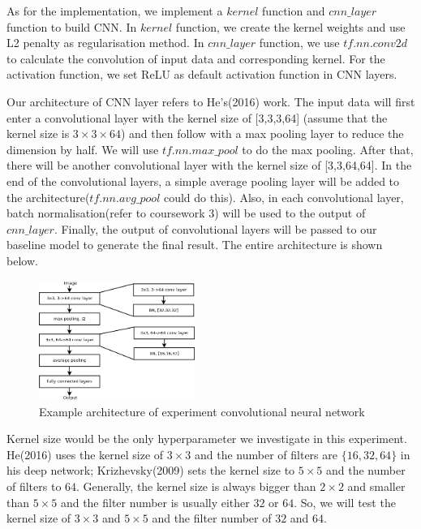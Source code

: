 \documentclass[]{article}
\begin{document}
As for the implementation, we implement a $kernel$ function and $cnn\_layer$ function to build CNN. In $kernel$ function, we create the kernel weights and use L2 penalty as regularisation method. In $cnn\_layer$ function, we use $tf.nn.conv2d$ to calculate the convolution of input data and corresponding kernel. For the activation function, we set ReLU as default activation function in CNN layers.

Our architecture of CNN layer refers to He's(2016) work. The input data will first enter a convolutional layer with the kernel size of [3,3,3,64] (assume that the kernel size is $3\times 3\times 64$) and then follow with a max pooling layer to reduce the dimension by half. We will use $tf.nn.max\_pool$ to do the max pooling. After that, there will be another convolutional layer with the kernel size of [3,3,64,64]. In the end of the convolutional layers, a simple average pooling layer will be added to the architecture($tf.nn.avg\_pool$ could do this). Also, in each convolutional layer, batch normalisation(refer to coursework 3) will be used to the output of $cnn\_layer$. Finally, the output of convolutional layers will be passed to our baseline model to generate the final result. The entire architecture is shown below.

\begin{figure}[!ht]
\begin{center}
\includegraphics[width = 2in]{conv_diam_1}
\caption{Example architecture of experiment convolutional neural network}
\end{center}
\end{figure}

Kernel size would be the only hyperparameter we investigate in this experiment. He(2016) uses the kernel size of $3\times 3$ and the number of filters are $\{16,32,64\}$ in his deep network; Krizhevsky(2009) sets the kernel size to $5\times 5$ and the number of filters to $64$. Generally, the kernel size is always bigger than $2\times 2$ and smaller than $5\times 5$ and the filter number is usually either $32$ or $64$. So, we will test the kernel size of $3\times 3$ and $5\times 5$ and the filter number of $32$ and $64$.
\end{document}
